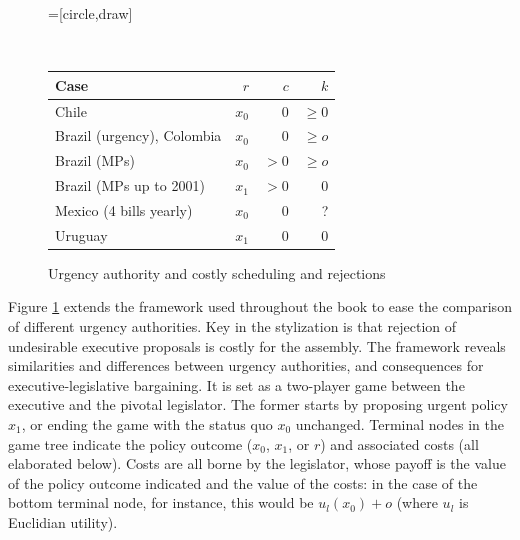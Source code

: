 \documentclass[letter,12pt]{article}
\newcommand{\emm}[1]{\todo[color=blue!30, inline]{\textbf{To do:} #1}}
\begin{document}

\begin{figure}
  \centering
    =[circle,draw]
      \\
 \footnotesize{
 \begin{tabular}{lrrr}
  Case                       & $r$   & $c$   & $k$      \\ \hline
  Chile                      & $x_0$ & 0     & $\geq0$     \\
  Brazil (urgency), Colombia & $x_0$ & 0     & $\geq o$    \\
  Brazil (MPs)               & $x_0$ & $>0$  & $\geq o$    \\
  Brazil (MPs up to 2001)    & $x_1$ & $>0$  & 0        \\
  Mexico (4 bills yearly)    & $x_0$ & 0     & ?        \\
  Uruguay                    & $x_1$ & 0     & 0        \\
  \end{tabular}
  }
\caption{Urgency authority and costly scheduling and rejections}\label{f:costly}
\end{figure}

Figure \ref{f:costly} extends the framework used throughout the book to ease the comparison of different urgency authorities. Key in the stylization is that rejection of undesirable executive proposals is costly for the assembly. The framework reveals similarities and differences between urgency authorities, and consequences for executive-legislative bargaining. It is set as a two-player game between the executive and the pivotal legislator. The former starts by proposing urgent policy $x_1$, or ending the game with the status quo $x_0$ unchanged. Terminal nodes in the game tree indicate the policy outcome ($x_0$, $x_1$, or $r$) and associated costs (all elaborated below). Costs are all borne by the legislator, whose payoff is the value of the policy outcome indicated and the value of the costs: in the case of the bottom terminal node, for instance, this would be $u_l(x_0)+o$ (where $u_l$ is Euclidian utility). 
\end{document}
